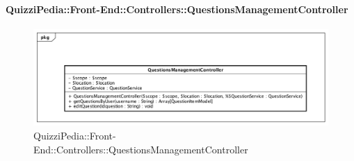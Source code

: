 \paragraph{QuizziPedia::Front-End::Controllers::QuestionsManagementController}
\begin{figure} [ht]
	\centering
	\includegraphics[scale=0.80]{UML/Classi/Front-End/QuizziPedia_Front-end_Controller_QuestionsManagementController.png}
	\caption{QuizziPedia::Front-End::Controllers::QuestionsManagementController}
\end{figure} \FloatBarrier
